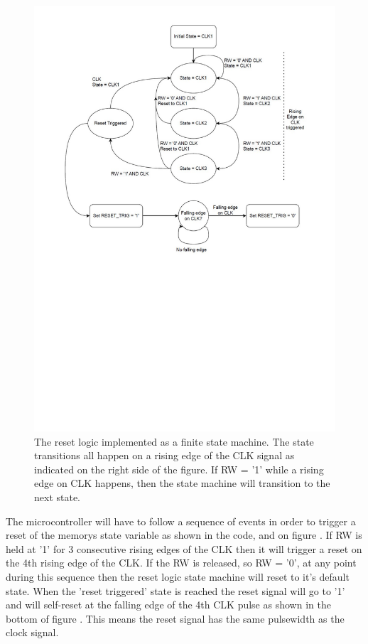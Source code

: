 \begin{figure}[H]
    \centering
    \includegraphics[clip, trim=0 340 0 0, width=1\textwidth]{Sections/7_SystemDesign/Figures/7_2_2_ResetLogicFSM.pdf}
    \caption{The reset logic implemented as a finite state machine. The state transitions all happen on a rising edge of the CLK signal as indicated on the right side of the figure. If RW = '1' while a rising edge on CLK happens, then the state machine will transition to the next state.}
    \label{fig:7_2_2_ResetLogicFSM}
\end{figure}

The microcontroller will have to follow a sequence of events in order to trigger a reset of the memorys state variable as shown in the code, and on figure . If RW is held at '1' for 3 consecutive rising edges of the CLK then it will trigger a reset on the 4th rising edge of the CLK. If the RW is released, so RW = '0', at any point during this sequence then the reset logic state machine will reset to it's default state. When the 'reset triggered' state is reached the reset signal will go to '1' and will self-reset at the falling edge of the 4th CLK pulse as shown in the bottom of figure . This means the reset signal has the same pulsewidth as the clock signal.